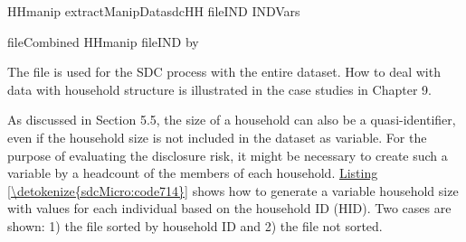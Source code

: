 \documentclass[letterpaper,10pt,english]{sphinxmanual}
\begin{document}
\def\sphinxLiteralBlockLabel{\label{\detokenize{sdcMicro:code713}}}
%
\begin{sphinxVerbatim}[commandchars=\\\{\},numbers=left,firstnumber=1,stepnumber=1]
     HHmanip  extractManipDatasdcHH
     fileIND  \PYG{p}{[}INDVars\PYG{p}{]}

     fileCombined  HHmanip fileIND by  
\end{sphinxVerbatim}

The file  is used for the SDC process with the entire
dataset. How to deal with data with household structure is illustrated
in the case studies in Chapter 9.

As discussed in Section 5.5, the size of a household can also be a
quasi-identifier, even if the household size is not included in the
dataset as variable. For the purpose of evaluating the disclosure risk,
it might be necessary to create such a variable by a headcount of the
members of each household. \hyperref[\detokenize{sdcMicro:code714}]{Listing \ref{\detokenize{sdcMicro:code714}}} shows how to generate a variable
household size with values for each individual based on the household ID
(HID). Two cases are shown: 1) the file sorted by household ID and 2)
the file not sorted.
\end{document}
